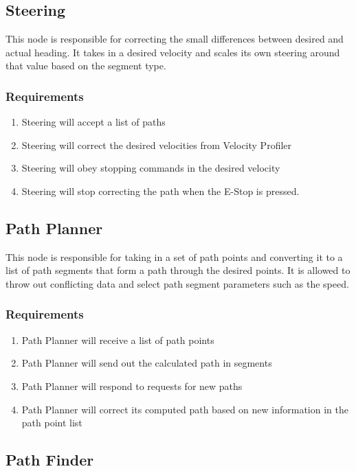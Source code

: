 \subsection{Steering}
  This node is responsible for correcting the small differences
  between desired and actual heading. It takes in a desired velocity and scales
  its own steering around that value based on the segment type.

  \subsubsection{Requirements}
  \begin{enumerate}
     \item Steering will accept a list of paths
     \item Steering will correct the desired velocities from Velocity
           Profiler
     \item Steering will obey stopping commands in the desired velocity
     \item Steering will stop correcting the path when the E-Stop is pressed.
  \end{enumerate}

\subsection{Path Planner}

This node is responsible for taking in a set of path points and converting it to a list of path segments that form a path through the desired points. It is allowed to throw out conflicting data and select path segment parameters such as the speed.

  \subsubsection{Requirements}
  \begin{enumerate}
    \item Path Planner will receive a list of path points
    \item Path Planner will send out the calculated path in segments
    \item Path Planner will respond to requests for new paths
    \item Path Planner will correct its computed path based on new information in the path point list
  \end{enumerate}

\subsection{Path Finder}

